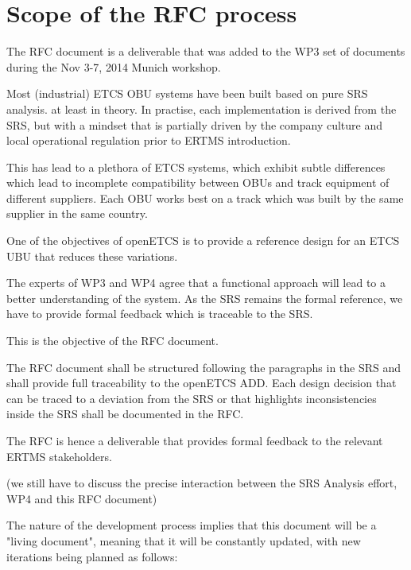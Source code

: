 \section{Scope of the RFC process}

The RFC document is a deliverable that was added to the WP3 set of documents during the Nov 3-7, 2014 Munich workshop.

Most (industrial) ETCS OBU systems have been built based on pure SRS analysis. at least in theory. In practise, each implementation is derived from the SRS, but with a mindset that is partially driven by the company culture and local operational regulation prior to ERTMS introduction.

This has lead to a plethora of ETCS systems, which exhibit subtle differences which lead to incomplete compatibility between OBUs and track equipment of different suppliers. Each OBU works best on a track which was built by the same supplier in the same country.

One of the objectives of openETCS is to provide a reference design for an ETCS UBU that reduces these variations.

The experts of WP3 and WP4 agree that a functional approach will lead to a better understanding of the system. As the SRS remains the formal reference, we have to provide formal feedback which is traceable to the SRS.

This is the objective of the RFC document.

The RFC document shall be structured following the paragraphs in the SRS and shall provide full traceability to the openETCS ADD.
Each design decision that can be traced to a deviation from the SRS or that highlights inconsistencies inside the SRS shall be documented in the RFC.

The RFC is hence a deliverable that provides formal feedback to the relevant ERTMS stakeholders.

(we still have to discuss the precise interaction between the SRS Analysis effort, WP4 and this RFC document)

The nature of the development process implies that this document will be a "living document", meaning that it will be constantly updated, with new iterations being planned as follows:

